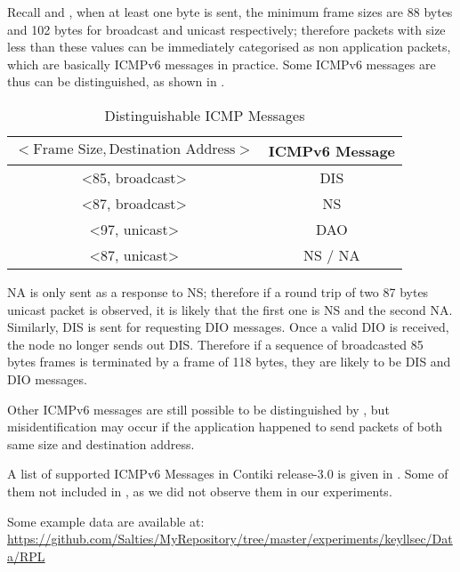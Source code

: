 Recall  and , when at least one byte is sent, the minimum frame sizes are 88 bytes and 102 bytes for broadcast and unicast respectively; therefore packets with size less than these values can be immediately categorised as non application packets, which are basically ICMPv6 messages in practice. Some ICMPv6 messages are thus can be distinguished, as shown in .

\begin{table}[ht!]
	\centering
	\begin{tabular}{|c|c|}
		\hline
		$<\text{Frame Size}, \text{Destination Address}>$                     & ICMPv6 Message \\ \hline
		\textless85, broadcast\textgreater & DIS            \\ \hline
		\textless87, broadcast\textgreater & NS             \\ \hline
		\textless97, unicast\textgreater   & DAO            \\ \hline
		\textless87, unicast\textgreater   & NS / NA        \\ \hline
	\end{tabular}
	\caption{Distinguishable ICMP Messages}
	\label{Tbl: Distinguishable ICMP Messages}
\end{table}

NA is only sent as a response to NS; therefore if a round trip of two 87 bytes unicast packet is observed, it is likely that the first one is NS and the second NA. Similarly, DIS is sent for requesting DIO messages.  Once a valid DIO is received, the node no longer sends out DIS. Therefore if a sequence of broadcasted 85 bytes frames is terminated by a frame of 118 bytes, they are likely to be DIS and DIO messages.

Other ICMPv6 messages are still possible to be distinguished by , but misidentification may occur if the application happened to send packets of both same size and destination address.

A list of supported ICMPv6 Messages in Contiki release-3.0 is given in . Some of them not included in , as we did not observe them in our experiments.

Some example data are available at:\\
\url{https://github.com/Salties/MyRepository/tree/master/experiments/keyllsec/Data/RPL}

